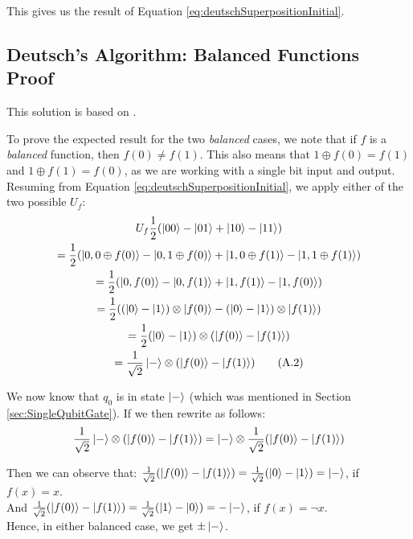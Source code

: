 \documentclass[conference]{IEEEtran}
\begin{document}
\begin{appendices}
This gives us the result of Equation \ref{eq:deutschSuperpositionInitial}.


\subsection{Deutsch's Algorithm: Balanced Functions Proof}
\label{appendix:DeutschsAlgorithmBalancedFunctionsProof}

This solution is based on \cite{ref:SevagGharibianDeutschAlgorithm}.

To prove the expected result for the two \textit{balanced} cases, we note that if $f$ is a \textit{balanced} function,
then $f(0) \ne f(1)$. This also means that $1 \oplus f(0) = f(1)$ and
$1 \oplus f(1) = f(0)$, as we are working with a single bit input and output.
Resuming from Equation \ref{eq:deutschSuperpositionInitial}, we apply either of the two possible $U_f$:
\begin{multline*}
    U_f \frac{1}{2}(\ket{00} - \ket{01} + \ket{10} - \ket{11}) \\
    = \frac{1}{2}(\ket{0, 0 \oplus f(0)} - \ket{0, 1 \oplus f(0)} + \ket{1, 0 \oplus f(1)} - \ket{1, 1 \oplus f(1)}) \\
    = \frac{1}{2}(\ket{0, f(0)} - \ket{0, f(1)} + \ket{1, f(1)} - \ket{1, f(0)}) \\
    = \frac{1}{2}((\ket{0} - \ket{1}) \otimes \ket{f(0)} - (\ket{0} - \ket{1}) \otimes \ket{f(1)}) \\
    = \frac{1}{2}(\ket{0} - \ket{1}) \otimes (\ket{f(0)} - \ket{f(1)}) \\
    = \frac{1}{\sqrt{2}}\ket{-} \otimes (\ket{f(0)} - \ket{f(1)}) \tag{A.2} \label{eq:deutschBalancedEq1}
\end{multline*}

We now know that $q_0$ is in state $\ket{-}$ (which was mentioned in Section \ref{sec:SingleQubitGate}).
If we then rewrite as follows:
\begin{multline*}
    \frac{1}{\sqrt{2}}\ket{-} \otimes (\ket{f(0)} - \ket{f(1)})
    =
    \ket{-} \otimes \frac{1}{\sqrt{2}}(\ket{f(0)} - \ket{f(1)})
\end{multline*}

Then we can observe that: $\frac{1}{\sqrt{2}}(\ket{f(0)} - \ket{f(1)}) = \frac{1}{\sqrt{2}}(\ket{0} - \ket{1}) = \ket{-}$, if $f(x) = x$. \\
And $\frac{1}{\sqrt{2}}(\ket{f(0)} - \ket{f(1)}) = \frac{1}{\sqrt{2}}(\ket{1} - \ket{0}) = -\ket{-}$, if $f(x) = \lnot x$. \\
Hence, in either balanced case, we get $\pm \ket{-}$.


\end{appendices}
\end{document}
